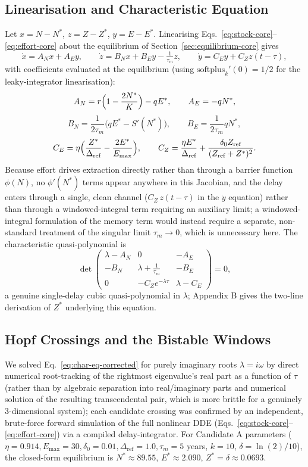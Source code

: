 \documentclass[twocolumn,10pt]{article}
\begin{document}
\subsection{Linearisation and Characteristic Equation}
Let \(x = N - N^*\), \(z = Z - Z^*\), \(y = E - E^*\). Linearising Eqs.~\eqref{eq:stock-core}--\eqref{eq:effort-core} about the equilibrium of Section~\ref{sec:equilibrium-core} gives
\[
\dot{x} = A_N x + A_E y, \qquad
\dot{z} = B_N x + B_E y - \tfrac{1}{\tau_m} z, \qquad
\dot{y} = C_E y + C_Z z(t-\tau),
\]
with coefficients evaluated at the equilibrium (using $\text{softplus}_k'(0)=1/2$ for the leaky-integrator linearisation):
\[
A_N = r\Bigl(1-\frac{2N^*}{K}\Bigr) - qE^*, \qquad A_E = -qN^*,
\]
\[
B_N = \frac{1}{2\tau_m}\bigl(qE^*-S'(N^*)\bigr), \qquad B_E = \frac{1}{2\tau_m}qN^*,
\]
\[
C_E = \eta\Bigl(\frac{Z^*}{\Delta_{\text{ref}}}-\frac{2E^*}{E_{\max}}\Bigr), \qquad C_Z = \frac{\eta E^*}{\Delta_{\text{ref}}} + \frac{\delta_0 Z_{\text{ref}}}{(Z_{\text{ref}}+Z^*)^2}.
\]
Because effort drives extraction directly rather than through a barrier function $\phi(N)$, no $\phi'(N^*)$ terms appear anywhere in this Jacobian, and the delay enters through a single, clean channel ($C_Z\,z(t-\tau)$ in the $\dot y$ equation) rather than through a windowed-integral term requiring an auxiliary limit; a windowed-integral formulation of the memory term would instead require a separate, non-standard treatment of the singular limit $\tau_m\to0$, which is unnecessary here. The characteristic quasi-polynomial is
\begin{equation}
\det\!\begin{pmatrix} \lambda-A_N & 0 & -A_E \\ -B_N & \lambda+\tfrac1{\tau_m} & -B_E \\ 0 & -C_Z e^{-\lambda\tau} & \lambda - C_E \end{pmatrix} = 0,
\label{eq:char-eq-corrected}
\end{equation}
a genuine single-delay cubic quasi-polynomial in $\lambda$; Appendix B gives the two-line derivation of $Z^*$ underlying this equation.

\subsection{Hopf Crossings and the Bistable Windows}
\label{sec:hopf-verified}
We solved Eq.~\eqref{eq:char-eq-corrected} for purely imaginary roots $\lambda=i\omega$ by direct numerical root-tracking of the rightmost eigenvalue's real part as a function of $\tau$ (rather than by algebraic separation into real/imaginary parts and numerical solution of the resulting transcendental pair, which is more brittle for a genuinely 3-dimensional system); each candidate crossing was confirmed by an independent, brute-force forward simulation of the full nonlinear DDE (Eqs.~\eqref{eq:stock-core}--\eqref{eq:effort-core}) via a compiled delay-integrator. For Candidate A parameters (\(\eta=0.914, E_{\max}=30, \delta_0=0.01, \Delta_{\text{ref}}=1.0, \tau_m=5\) years, $k=10$, $\delta=\ln(2)/10$), the closed-form equilibrium is $N^*\approx89.55$, $E^*\approx2.090$, $Z^*=\delta\approx0.0693$.
\end{document}
